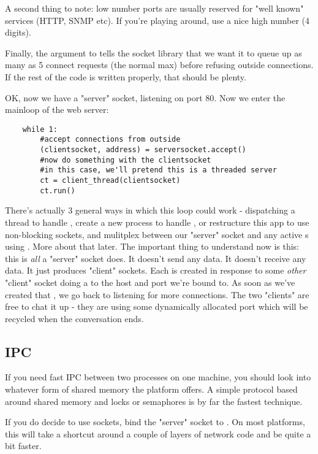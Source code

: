 \documentclass{howto}
\begin{document}
A second thing to note: low number ports are usually reserved for
"well known" services (HTTP, SNMP etc). If you're playing around, use
a nice high number (4 digits).

Finally, the argument to  tells the socket library that
we want it to queue up as many as 5 connect requests (the normal max)
before refusing outside connections. If the rest of the code is
written properly, that should be plenty.

OK, now we have a "server" socket, listening on port 80. Now we enter
the mainloop of the web server:

\begin{verbatim}
    while 1:
        #accept connections from outside
        (clientsocket, address) = serversocket.accept()
        #now do something with the clientsocket
        #in this case, we'll pretend this is a threaded server
        ct = client_thread(clientsocket)
        ct.run()
\end{verbatim}

There's actually 3 general ways in which this loop could work -
dispatching a thread to handle , create a new
process to handle , or restructure this app
to use non-blocking sockets, and mulitplex between our "server" socket
and any active s using
. More about that later. The important thing to
understand now is this: this is \emph{all} a "server" socket
does. It doesn't send any data. It doesn't receive any data. It just
produces "client" sockets. Each  is created
in response to some \emph{other} "client" socket doing a
 to the host and port we're bound to. As soon as
we've created that , we go back to listening
for more connections. The two "clients" are free to chat it up - they
are using some dynamically allocated port which will be recycled when
the conversation ends.

\subsection{IPC} If you need fast IPC between two processes
on one machine, you should look into whatever form of shared memory
the platform offers. A simple protocol based around shared memory and
locks or semaphores is by far the fastest technique.

If you do decide to use sockets, bind the "server" socket to
. On most platforms, this will take a shortcut
around a couple of layers of network code and be quite a bit faster.
\end{document}
